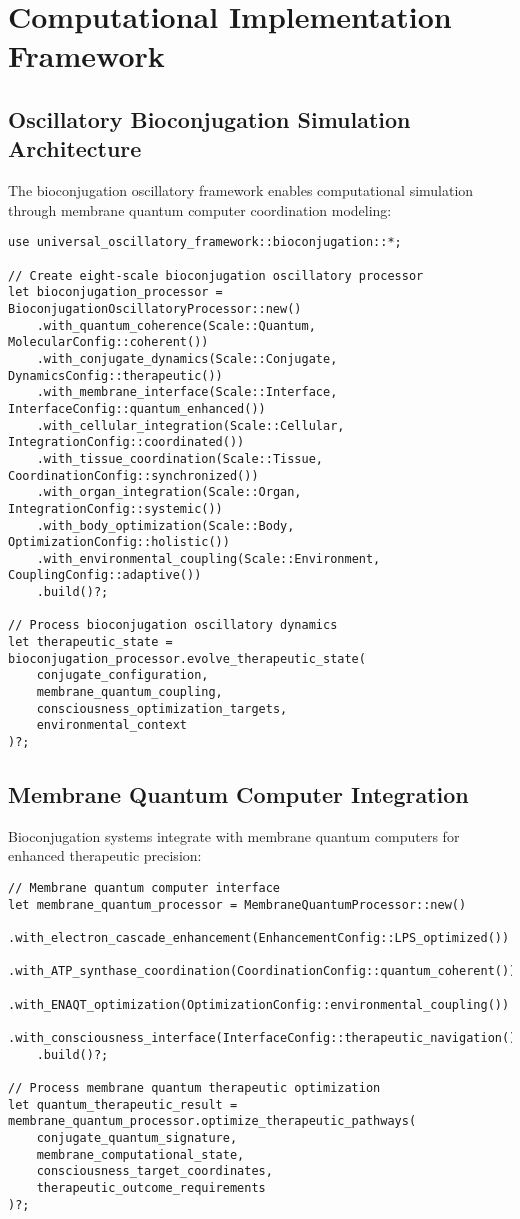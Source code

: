 \documentclass[12pt,a4paper]{article}
\begin{document}
\section{Computational Implementation Framework}

\subsection{Oscillatory Bioconjugation Simulation Architecture}

The bioconjugation oscillatory framework enables computational simulation through membrane quantum computer coordination modeling:

\begin{verbatim}
use universal_oscillatory_framework::bioconjugation::*;

// Create eight-scale bioconjugation oscillatory processor
let bioconjugation_processor = BioconjugationOscillatoryProcessor::new()
    .with_quantum_coherence(Scale::Quantum, MolecularConfig::coherent())
    .with_conjugate_dynamics(Scale::Conjugate, DynamicsConfig::therapeutic())
    .with_membrane_interface(Scale::Interface, InterfaceConfig::quantum_enhanced())
    .with_cellular_integration(Scale::Cellular, IntegrationConfig::coordinated())
    .with_tissue_coordination(Scale::Tissue, CoordinationConfig::synchronized())
    .with_organ_integration(Scale::Organ, IntegrationConfig::systemic())
    .with_body_optimization(Scale::Body, OptimizationConfig::holistic())
    .with_environmental_coupling(Scale::Environment, CouplingConfig::adaptive())
    .build()?;

// Process bioconjugation oscillatory dynamics
let therapeutic_state = bioconjugation_processor.evolve_therapeutic_state(
    conjugate_configuration,
    membrane_quantum_coupling,
    consciousness_optimization_targets,
    environmental_context
)?;
\end{verbatim}

\subsection{Membrane Quantum Computer Integration}

Bioconjugation systems integrate with membrane quantum computers for enhanced therapeutic precision:

\begin{verbatim}
// Membrane quantum computer interface
let membrane_quantum_processor = MembraneQuantumProcessor::new()
    .with_electron_cascade_enhancement(EnhancementConfig::LPS_optimized())
    .with_ATP_synthase_coordination(CoordinationConfig::quantum_coherent())
    .with_ENAQT_optimization(OptimizationConfig::environmental_coupling())
    .with_consciousness_interface(InterfaceConfig::therapeutic_navigation())
    .build()?;

// Process membrane quantum therapeutic optimization
let quantum_therapeutic_result = membrane_quantum_processor.optimize_therapeutic_pathways(
    conjugate_quantum_signature,
    membrane_computational_state,
    consciousness_target_coordinates,
    therapeutic_outcome_requirements
)?;
\end{verbatim}
\end{document}
